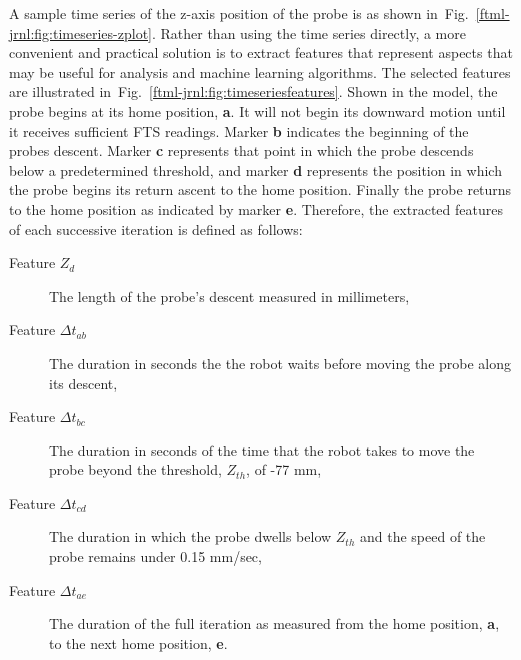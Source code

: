 A sample time series of the z-axis position of the probe is as shown in~Fig.~\ref{ftml-jrnl:fig:timeseries-zplot}.  Rather than using the time series directly, a more convenient and practical solution is to extract features that represent aspects that may be useful for analysis and machine learning algorithms. The selected features are illustrated in~Fig.~\ref{ftml-jrnl:fig:timeseriesfeatures}. Shown in the model, the probe begins at its home position, \textbf{a}.  It will not begin its downward motion until it receives sufficient FTS readings.  Marker \textbf{b} indicates the beginning of the probes descent.  Marker \textbf{c} represents that point in which the probe descends below a predetermined threshold, and marker \textbf{d} represents the position in which the probe begins its return ascent to the home position.  Finally the probe returns to the home position as indicated by marker \textbf{e}.  Therefore, the extracted features of each successive iteration is defined as follows:

\begin{description}
	\item[Feature $Z_d$] The length of the probe's descent measured in millimeters,
	\item[Feature $\Delta{t}_{ab}$] The duration in seconds the the robot waits before moving the probe along its descent,
	\item[Feature $\Delta{t}_{bc}$] The duration in seconds of the time that the robot takes to move the probe beyond the threshold, $Z_{th}$, of -77 mm,
	\item[Feature $\Delta{t}_{cd}$] The duration in which the probe dwells below $Z_{th}$ and the speed of the probe remains under 0.15 mm/sec,
	\item[Feature $\Delta{t}_{ae}$] The duration of the full iteration as measured from the home position, \textbf{a}, to the next home position, \textbf{e}.
\end{description}

